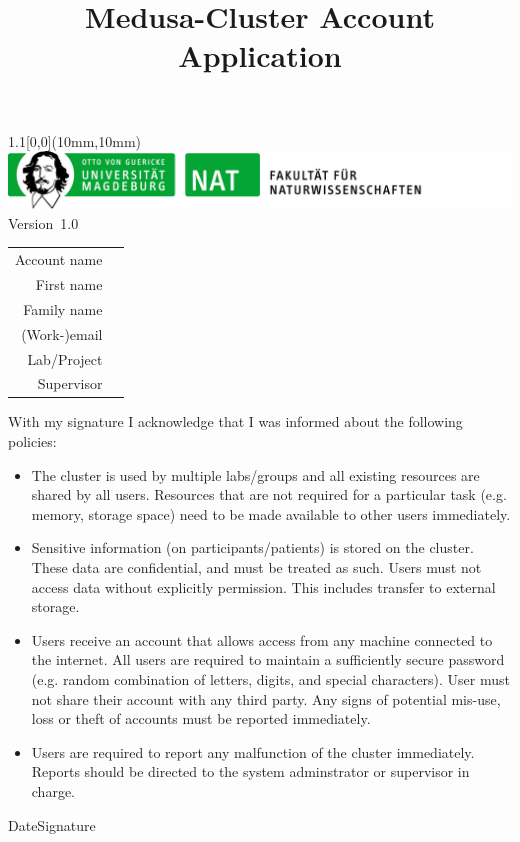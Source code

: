 \documentclass[paper=a4]{scrartcl}
\title{Medusa-Cluster Account Application}
\date{}
\begin{document}
\maketitle
\thispagestyle{empty}
\begin{textblock*}{1.1\linewidth}[0,0](10mm,10mm)%
  \includegraphics[width=\linewidth]{unibrief_logo_nat.png}%
  Version~1.0
\end{textblock*}

\vspace{-2.5cm}
\setlength{\extrarowheight}{1cm}

\begin{tabular}[]{rl}
  Account name & \uline{\hspace{10cm}} \\
  First name & \uline{\hspace{10cm}} \\
  Family name & \uline{\hspace{10cm}} \\
  (Work-)email & \uline{\hspace{10cm}} \\
  Lab/Project & \uline{\hspace{10cm}} \\
  Supervisor & \uline{\hspace{10cm}} \\
\end{tabular}

\vspace{1cm}
\noindent With my signature I acknowledge that I was informed about the
following policies:
\begin{itemize}
  \item The cluster is used by multiple labs/groups and all existing resources
    are shared by all users. Resources that are not required for a particular
    task (e.g. memory, storage space) need to be made available to other users
    immediately.
  \item Sensitive information (on participants/patients) is stored on the
    cluster. These data are confidential, and must be treated as such.
    Users must not access data without explicitly permission. This includes
    transfer to external storage.
  \item Users receive an account that allows access from any machine connected
    to the internet. All users are required to maintain a sufficiently secure
    password (e.g. random combination of letters, digits, and special
    characters). User must not share their account with any third party.
    Any signs of potential mis-use, loss or theft of accounts must be reported
    immediately.
  \item Users are required to report any malfunction of the cluster immediately.
    Reports should be directed to the system adminstrator or supervisor in
    charge.

\end{itemize}
\vspace{3cm}

\hspace{2cm}Date\hfill Signature\hspace{2cm}
\end{document}
